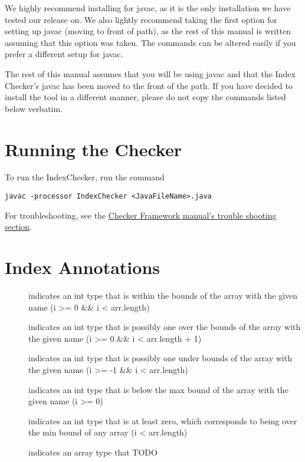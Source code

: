 We highly recommend installing for javac, as it is the only installation we have tested our release on. We also lightly recommend taking the first option for setting up javac (moving to front of path), as the rest of this manual is written assuming that this option was taken. The commands can be altered easily if you prefer a different setup for javac.

The rest of this manual assumes that you will be using javac and that the Index Checker's javac has been moved to the front of the path. If you have decided to install the tool in a different manner, please do not copy the commands listed below verbatim.

\section{Running the Checker\label{index-running}}

To run the IndexChecker, run the command

\begin{Verbatim}
javac -processor IndexChecker <JavaFileName>.java
\end{Verbatim}

For troubleshooting, see the \href{http://types.cs.washington.edu/checker-framework/current/checker-framework-manual.html#troubleshooting}{Checker Framework manual's trouble shooting section}.

\section{Index Annotations\label{index-annotations}}

\begin{description}
\item[]
	indicates an int type that is within the bounds of the array with the given name (i >= 0 \&\& i < arr.length)
\item[]
	indicates an int type that is possibly one over the bounds of the array with the given name (i >= 0 \&\& i < arr.length + 1)
\item[]
	indicates an int type that is possibly one under bounds of the array with the given name (i >= -1 \&\& i < arr.length)
\item[]
	indicates an int type that is below the max bound of the array with the given name (i >= 0)
\item[]
	indicates an int type that is at least zero, which corresponds to being over the min bound of any array (i < arr.length)
\item[]
	indicates an array type that TODO
\end{description}

